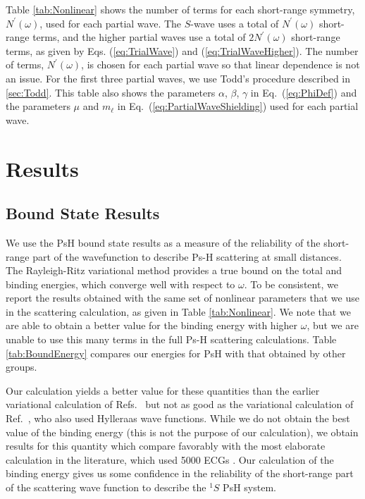 \documentclass[preprint,showpacs,showkeys,preprintnumbers,amsmath,amssymb,longbibliography,pra,aps]{revtex4-1}
\begin{document}
Table \ref{tab:Nonlinear} shows the number of terms for each short-range 
symmetry, $N^\prime(\omega)$, used for each partial wave. The $S$-wave uses a 
total of $N^\prime(\omega)$ short-range terms, and the higher partial waves 
use a total of $2 N^\prime(\omega)$ short-range terms, as given by Eqs.
(\ref{eq:TrialWave}) and (\ref{eq:TrialWaveHigher}).
The number of terms, $N^\prime(\omega)$, is chosen for each partial wave so
that linear dependence is not an issue. For the first three partial waves,
we use Todd's procedure described in \ref{sec:Todd}.
This table also shows the parameters $\alpha$, $\beta$,
$\gamma$ in Eq.~(\ref{eq:PhiDef}) and the parameters $\mu$ and $m_\ell$ in 
Eq.~(\ref{eq:PartialWaveShielding}) used for each partial wave.


\section{Results}
\label{sec:Results}

\subsection{Bound State Results}

We use the PsH bound state results as a measure of the reliability of the 
short-range part of the wavefunction to describe Ps-H scattering at small 
distances. The Rayleigh-Ritz variational method provides a true bound on the 
total and binding energies, which converge well with respect to $\omega$. To 
be consistent, we report the results obtained with the same set of nonlinear 
parameters that we use in the scattering calculation, as given in
Table \ref{tab:Nonlinear}. We note that we are able to obtain a better value for
the binding energy with higher $\omega$, but we are unable to use this many
terms in the full Ps-H scattering calculations. Table \ref{tab:BoundEnergy} 
compares our energies for PsH with that obtained by other groups.

Our calculation yields a better value for these quantities than the earlier 
variational calculation of Refs.~\cite{VanReeth2003,VanReeth2004} but not
as good as the variational calculation of Ref.~\cite{Yan1999}, who also
used Hylleraas wave functions. While we do not obtain the best value of the 
binding energy (this is not the purpose of our calculation), we obtain 
results for this quantity which compare favorably with the most elaborate 
calculation in the literature, which used 5000 ECGs \cite{Bubin2006}. Our 
calculation of the binding energy gives us some confidence in the reliability 
of the short-range part of the scattering wave function to describe the $^1S$ 
PsH system.
\end{document}
